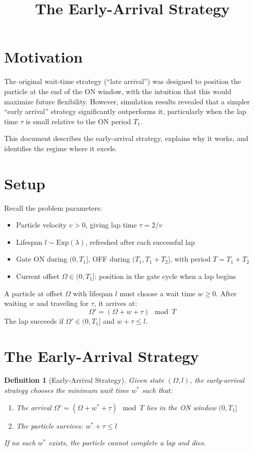 \documentclass{article}
\title{The Early-Arrival Strategy}
\author{}
\date{}
\newtheorem{definition}{Definition}
\begin{document}
\maketitle

\section{Motivation}

The original wait-time strategy (``late arrival'') was designed to position the particle at the end of the ON window, with the intuition that this would maximize future flexibility. However, simulation results revealed that a simpler ``early arrival'' strategy significantly outperforms it, particularly when the lap time $\tau$ is small relative to the ON period $T_1$.

This document describes the early-arrival strategy, explains why it works, and identifies the regime where it excels.

\section{Setup}

Recall the problem parameters:
\begin{itemize}
    \item Particle velocity $v > 0$, giving lap time $\tau = 2/v$
    \item Lifespan $l \sim \text{Exp}(\lambda)$, refreshed after each successful lap
    \item Gate ON during $(0, T_1]$, OFF during $(T_1, T_1 + T_2]$, with period $T = T_1 + T_2$
    \item Current offset $\Omega \in (0, T_1]$: position in the gate cycle when a lap begins
\end{itemize}

A particle at offset $\Omega$ with lifespan $l$ must choose a wait time $w \geq 0$. After waiting $w$ and traveling for $\tau$, it arrives at:
\[
\Omega' = (\Omega + w + \tau) \mod T
\]
The lap succeeds if $\Omega' \in (0, T_1]$ and $w + \tau \leq l$.

\section{The Early-Arrival Strategy}

\begin{definition}[Early-Arrival Strategy]
Given state $(\Omega, l)$, the early-arrival strategy chooses the minimum wait time $w^*$ such that:
\begin{enumerate}
    \item The arrival $\Omega' = (\Omega + w^* + \tau) \mod T$ lies in the ON window $(0, T_1]$
    \item The particle survives: $w^* + \tau \leq l$
\end{enumerate}
If no such $w^*$ exists, the particle cannot complete a lap and dies.
\end{definition}
\end{document}
